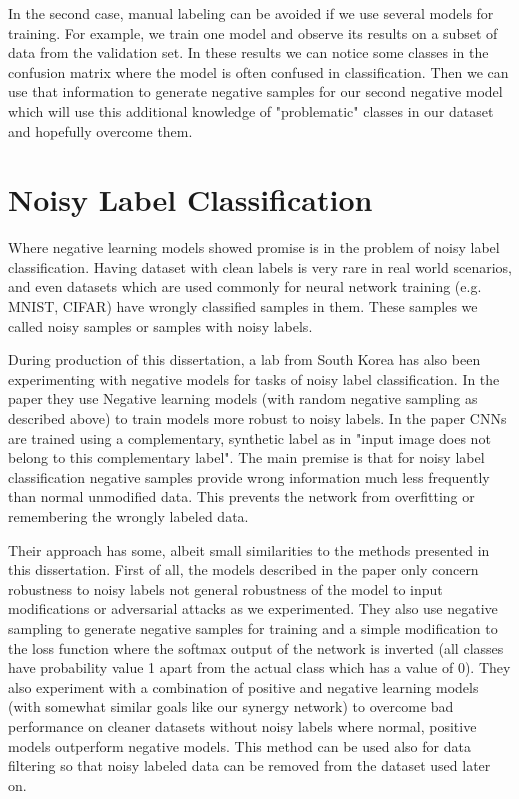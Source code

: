 \documentclass[b5paper]{book}
\let\cite\parencite
\begin{document}
In the second case, manual labeling can be avoided if we use several models for training. For example, we train one model and observe its results on a subset of data from the validation set. In these results we can notice some classes in the confusion matrix where the model is often confused in classification. Then we can use that information to generate negative samples for our second negative model which will use this additional knowledge of "problematic" classes in our dataset and hopefully overcome them.

\section{Noisy Label Classification}
\label{noisylabels}

Where negative learning models showed promise is in the problem of noisy label classification. Having dataset with clean labels is very rare in real world scenarios, and even datasets which are used commonly for neural network training (e.g. MNIST, CIFAR) have wrongly classified samples in them. These samples we called noisy samples or samples with noisy labels.

During production of this dissertation, a lab from South Korea has also been experimenting with negative models for tasks of noisy label classification. \cite{kim2019nlnl} In the paper they use Negative learning models (with random negative sampling as described above) to train models more robust to noisy labels. In the paper CNNs are trained using a complementary, synthetic label as in "input image does not belong to this complementary label". The main premise is that for noisy label classification negative samples provide wrong information much less frequently than normal unmodified data. This prevents the network from overfitting or remembering the wrongly labeled data.

Their approach has some, albeit small similarities to the methods presented in this dissertation. First of all, the models described in the paper only concern robustness to noisy labels not general robustness of the model to input modifications or adversarial attacks as we experimented. They also use negative sampling to generate negative samples for training and a simple modification to the loss function where the softmax output of the network is inverted (all classes have probability value 1 apart from the actual class which has a value of 0). They also experiment with a combination of positive and negative learning models (with somewhat similar goals like our synergy network) to overcome bad performance on cleaner datasets without noisy labels where normal, positive models outperform negative models. This method can be used also for data filtering so that noisy labeled data can be removed from the dataset used later on.
\end{document}
